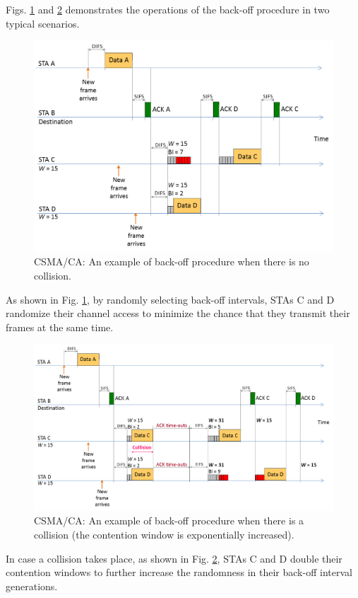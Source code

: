 Figs. \ref{figs:CSMA-CA-back-off-no-collision} and \ref{figs:CSMA-CA-back-off-with-collision} demonstrates the operations of the back-off procedure in two typical scenarios. 
\begin{figure}[!ht]
	\centering
	\includegraphics[width=\columnwidth]{figs/CSMA-CA-back-off-no-collision}
	\caption{CSMA/CA: An example of back-off procedure when there is no collision.}
	\label{figs:CSMA-CA-back-off-no-collision}
\end{figure}
As shown in Fig. \ref{figs:CSMA-CA-back-off-no-collision}, by randomly selecting back-off intervals, STAs C and D randomize their channel access to minimize the chance that they transmit their frames at the same time. 
\begin{figure}[!ht]
	\centering
	\includegraphics[width=1.0\columnwidth]{figs/CSMA-CA-back-off-with-collision}
	\caption{CSMA/CA: An example of back-off procedure when there is a collision (the contention window is exponentially increased).}
	\label{figs:CSMA-CA-back-off-with-collision}
\end{figure}
In case a collision takes place, as shown in Fig. \ref{figs:CSMA-CA-back-off-with-collision}, STAs C and D double their contention windows to further increase the randomness in their back-off interval generations.

